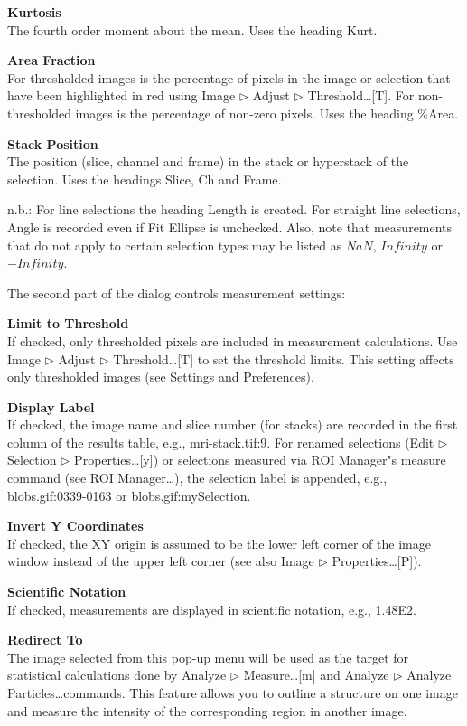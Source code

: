 \textbf{Kurtosis}\\The fourth order moment about the mean. Uses the
heading Kurt.

\textbf{Area Fraction}\\For thresholded images is the percentage of
pixels in the image or selection that have been highlighted in red
using Image ${\triangleright}$ Adjust ${\triangleright}$
Threshold\ldots [T]. For non-thresholded images is the percentage of
non-zero pixels. Uses the heading \%Area.

\textbf{Stack Position}\\The position (slice, channel and frame) in
the stack or hyperstack of the selection. Uses the headings Slice, Ch
and Frame.

n.b.: For line selections the heading Length is created. For straight
line selections, Angle is recorded even if Fit Ellipse is unchecked.
Also, note that measurements that do not apply to certain selection
types may be listed as $NaN$, 
$Infinity$ or $-Infinity$.

The second part of the dialog controls measurement settings:

\textbf{Limit to Threshold}\\If checked, only thresholded pixels
are included in measurement calculations. Use Image ${\triangleright}$
Adjust ${\triangleright}$ Threshold\ldots [T] to set the threshold
limits. This setting affects only thresholded images (see Settings and
Preferences).

\textbf{Display Label}\\If checked, the image name and slice number
(for stacks) are recorded in the first column of the results table,
e.g., mri-stack.tif:9. For renamed selections (Edit ${\triangleright}$
Selection ${\triangleright}$ Properties\ldots [y]) or selections
measured via ROI Manager"s measure command (see ROI
Manager\ldots), the selection label is appended, e.g.,
blobs.gif:0339-0163 or blobs.gif:mySelection.


\textbf{Invert Y Coordinates}\\If checked, the XY origin is assumed
to be the lower left corner of the image window instead of the upper
left corner (see also Image ${\triangleright}$ Properties\ldots [P]).

\textbf{Scientific Notation}\\If checked, measurements are
displayed in scientific notation, e.g., 1.48E2.

\textbf{Redirect To}\\The image selected from this pop-up menu will
be used as the target for statistical calculations done by Analyze
${\triangleright}$ Measure\ldots [m] and Analyze ${\triangleright}$
Analyze Particles\ldots commands. This feature allows you to outline a
structure on one image and measure the intensity of the corresponding
region in another image.

